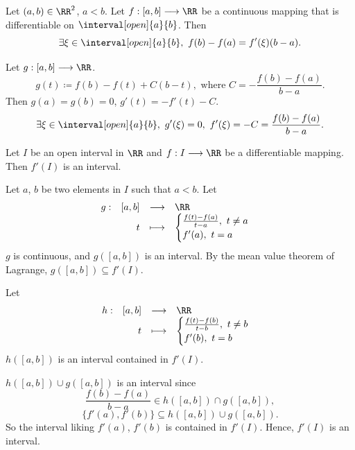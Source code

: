\begin{theoremenv}
    Let $(a,b)\in \RR^2$, $a<b$. Let $f:[a,b]\longrightarrow \RR$ be a continuous mapping that is differentiable on $\interval[open]{a}{b}$. Then 
    $$\exists \xi\in \interval[open]{a}{b},\ f(b)-f(a)=f'(\xi)(b-a).$$
    
\end{theoremenv}
\begin{proofenv}
    Let $g:[a,b]\longrightarrow \RR$.
    $$ g(t)\coloneq f(b)-f(t)+C(b-t), \text{ where } C=-\frac{f(b)-f(a)}{b-a}.$$
    Then $g(a)=g(b)=0$, $g'(t)=-f'(t)-C$. 
    $$\exists \xi\in \interval[open]{a}{b},\ g'(\xi)=0,\ f'(\xi)=-C=\frac{f(b)-f(a)}{b-a}.$$
\end{proofenv}

\begin{theoremenv}[Darboux]
    Let $I$ be an open interval in $\RR$ and $f:I\longrightarrow \RR$ be a differentiable mapping. Then $f'(I)$  is an interval.
\end{theoremenv}
\begin{proofenv}
    Let $a$, $b$ be two elements in $I$ such that $a<b$. Let
    $$\begin{array}{rrcl}
        g:&[a,b]&\longrightarrow& \RR\\
        &t&\longmapsto& \begin{cases}
            \frac{f(t)-f(a)}{t-a},\ t\neq a\\
            f'(a),\ t=a
        \end{cases} 
    \end{array}$$
    $g$ is continuous, and $g([a,b])$ is an interval. By the mean value theorem of Lagrange, $g([a,b])\subseteq f'(I)$.
    
    Let
    $$\begin{array}{rrcl}
        h:&[a,b]&\longrightarrow& \RR\\
        &t&\longmapsto& \begin{cases}
            \frac{f(t)-f(b)}{t-b},\ t\neq b\\
            f'(b),\ t=b
        \end{cases}
    \end{array}$$
    $h([a,b])$ is an interval contained in $f'(I)$. 

    \quad $h([a,b])\cup g([a,b])$ is an interval since 
    $$ \frac{f(b)-f(a)}{b-a}\in h([a,b])\cap g([a,b]),$$
    $$\{ f'(a),f'(b)\}\subseteq h([a,b])\cup g([a,b]).$$
    So the interval liking $f'(a)$, $f'(b)$ is contained in $f'(I)$. Hence, $f'(I)$ is an interval.
\end{proofenv}



